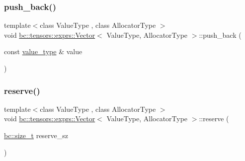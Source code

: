 \subsubsection{\texorpdfstring{push\+\_\+back()}{push\_back()}\hspace{0.1cm}{\footnotesize\ttfamily [2/2]}}
{\footnotesize\ttfamily template$<$class Value\+Type , class Allocator\+Type $>$ \\
void \hyperlink{structbc_1_1tensors_1_1exprs_1_1Vector}{bc\+::tensors\+::exprs\+::\+Vector}$<$ Value\+Type, Allocator\+Type $>$\+::push\+\_\+back (\begin{DoxyParamCaption}\item[{const \hyperlink{structbc_1_1tensors_1_1exprs_1_1Vector_a61ba759af8b26329103ce2b0765dade5}{value\+\_\+type} \&}]{value }\end{DoxyParamCaption})\hspace{0.3cm}{\ttfamily [inline]}}

\mbox{\label{structbc_1_1tensors_1_1exprs_1_1Vector_acf3a12f0ddeed3faefeab349a1cebe0b}} 
\subsubsection{\texorpdfstring{reserve()}{reserve()}}
{\footnotesize\ttfamily template$<$class Value\+Type , class Allocator\+Type $>$ \\
void \hyperlink{structbc_1_1tensors_1_1exprs_1_1Vector}{bc\+::tensors\+::exprs\+::\+Vector}$<$ Value\+Type, Allocator\+Type $>$\+::reserve (\begin{DoxyParamCaption}\item[{\hyperlink{namespacebc_aaf8e3fbf99b04b1b57c4f80c6f55d3c5}{bc\+::size\+\_\+t}}]{reserve\+\_\+sz }\end{DoxyParamCaption})\hspace{0.3cm}{\ttfamily [inline]}}

\mbox{\label{structbc_1_1tensors_1_1exprs_1_1Vector_a71d51235cb50956b6965102466a7a338}} 
